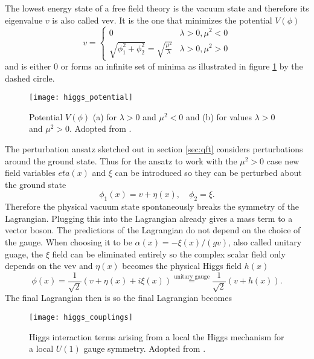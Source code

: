 The lowest energy state of a free field theory is the vacuum state and therefore its eigenvalue $v$ is also called \ac{vev}. It is the one that minimizes the potential $V(\phi)$
\begin{equation}
    v =
    \begin{cases}
        0                                                     & \lambda>0, \mu^2<0 \\
        \sqrt{\phi_1^2+\phi_2^2}=\sqrt{\frac{\mu^2}{\lambda}} & \lambda>0, \mu^2>0
    \end{cases}
\end{equation}
and is either 0 or forms an infinite set of minima as illustrated in figure \ref{fig:higgs_potential} by the dashed circle.
\begin{figure}
    \centering
    \texttt{[image: higgs\_potential]}
    \caption[]{Potential $V(\phi)$ (a) for $\lambda>0$ and $\mu^2<0$ and (b) for values $\lambda>0$ and $\mu^2>0$. Adopted from \citep{thomson2013modern}.}
    \label{fig:higgs_potential}
\end{figure}

The perturbation ansatz sketched out in section \ref{sec:qft} considers perturbations around the ground state. Thus for the ansatz to work with the $\mu^2>0$ case new field variables $eta(x)$ and $\xi$ can be introduced so they can be perturbed about the ground state
\begin{equation}
    \phi_1(x)=v+\eta(x),\quad \phi_2=\xi.
\end{equation}
Therefore the physical vacuum state spontaneously breaks the symmetry of the Lagrangian. Plugging this into the Lagrangian already gives a mass term to a vector boson. The predictions of the Lagrangian do not depend on the choice of the gauge. When choosing it to be $\alpha(x)=-\xi(x)/(gv)$, also called unitary guage, the $\xi$ field can be eliminated entirely so the complex scalar field only depends on the \ac{vev} and $\eta(x)$ becomes the physical Higgs field $h(x)$
\begin{equation}
    \phi(x)=\frac{1}{\sqrt{2}}(v+\eta(x)+i\xi(x)) 
    \stackrel{\text{unitary gauge}}{=} 
    \frac{1}{\sqrt{2}}(v+h(x)).
\end{equation}
The final Lagrangian then is
so the final Lagrangian becomes





\begin{figure}
    \centering
    \texttt{[image: higgs\_couplings]}
    \caption[]{Higgs interaction terms arising from a local the Higgs mechanism for a local $U(1)$ gauge symmetry. Adopted from \citep{thomson2013modern}.}
    \label{fig:higgs_couplings}
\end{figure}







